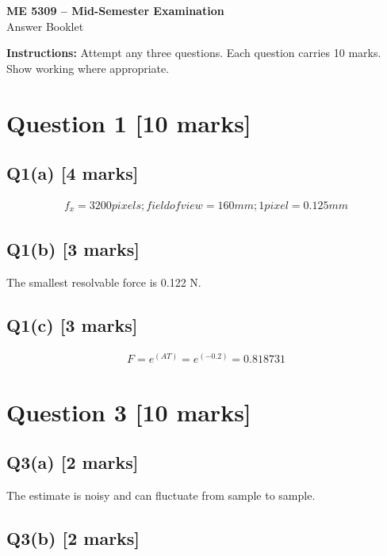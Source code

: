 \documentclass[11pt,a4paper]{article}
\begin{document}
\begin{center}
{\Large\bfseries ME 5309 -- Mid-Semester Examination}\\[3pt]
{\large Answer Booklet}\\[8pt]
\end{center}
\textbf{Instructions:} Attempt any three questions. Each question carries 10 marks. Show working where appropriate.
\section*{Question 1 \hfill [10 marks]}
\subsection*{Q1(a) \hfill [4 marks]}

\[\begin{aligned}f_x = 3200 pixels; field of view = 160 mm; 1 pixel = 0.125 mm\end{aligned}\]

\subsection*{Q1(b) \hfill [3 marks]}

The smallest resolvable force is 0.122 N.

\subsection*{Q1(c) \hfill [3 marks]}

\[\begin{aligned}F = e^(AT) = e^(-0.2) = 0.818731\end{aligned}\]

\section*{Question 3 \hfill [10 marks]}
\subsection*{Q3(a) \hfill [2 marks]}

The estimate is noisy and can fluctuate from sample to sample.

\subsection*{Q3(b) \hfill [2 marks]}

\vspace{2mm}
\end{document}
